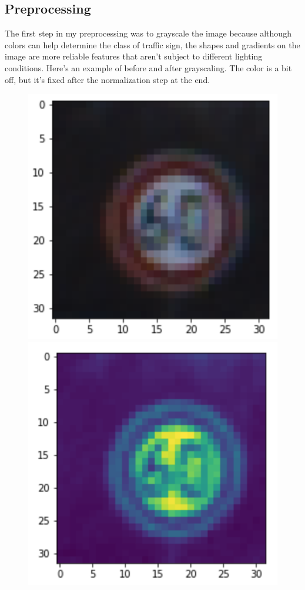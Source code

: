 \documentclass[12pt]{article}
\begin{document}
\subsection{Preprocessing}
The first step in my preprocessing was to grayscale the image because although colors can help determine the class of traffic sign, the shapes and gradients on the image are more reliable features that aren't subject to different lighting conditions. Here's an example of before and after grayscaling. The color is a bit off, but it's fixed after the normalization step at the end.
\begin{figure}[!h]
\includegraphics[scale = 0.5]{writeup_images/im1.png}
\includegraphics[scale = 0.5]{writeup_images/grayscale.png}
\end{figure}
\end{document}
